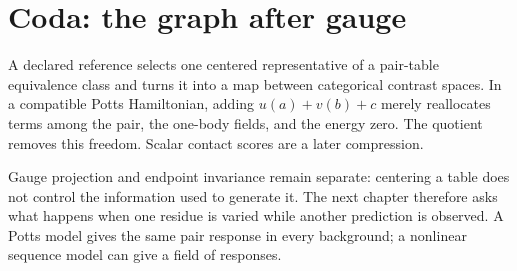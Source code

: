 \section*{Coda: the graph after gauge}

A declared reference selects one centered representative of a pair-table equivalence class and
turns it into a map between categorical contrast spaces.  In a compatible Potts Hamiltonian,
adding $u(a)+v(b)+c$ merely reallocates terms among the pair, the one-body fields, and the energy
zero.  The quotient removes this freedom.  Scalar contact scores are a later compression.

Gauge projection and endpoint invariance remain separate: centering a table does not control the
information used to generate it.  The next chapter therefore asks what happens when one residue
is varied while another prediction is observed.  A Potts model gives the same pair response in
every background; a nonlinear sequence model can give a field of responses.
